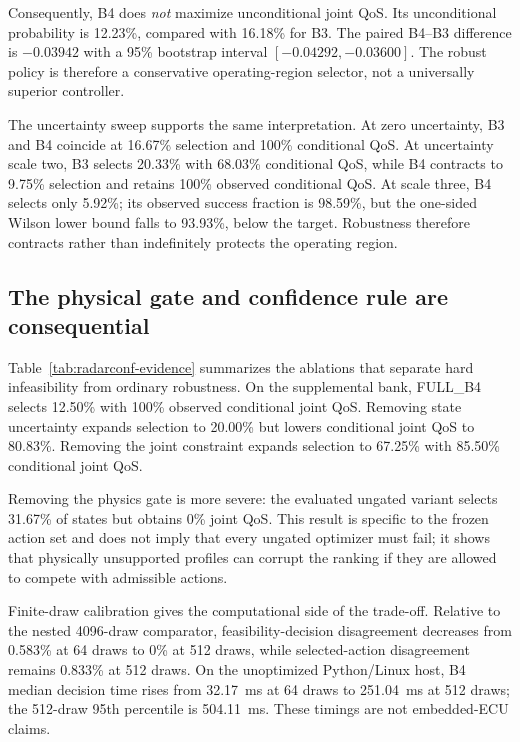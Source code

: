 \documentclass[conference,a4paper]{IEEEtran}
\begin{document}
Consequently, B4 does \emph{not} maximize unconditional joint QoS. Its unconditional probability is 12.23\%, compared with 16.18\% for B3. The paired B4--B3 difference is $-0.03942$ with a 95\% bootstrap interval $[-0.04292,-0.03600]$. The robust policy is therefore a conservative operating-region selector, not a universally superior controller.

The uncertainty sweep supports the same interpretation. At zero uncertainty, B3 and B4 coincide at 16.67\% selection and 100\% conditional QoS. At uncertainty scale two, B3 selects 20.33\% with 68.03\% conditional QoS, while B4 contracts to 9.75\% selection and retains 100\% observed conditional QoS. At scale three, B4 selects only 5.92\%; its observed success fraction is 98.59\%, but the one-sided Wilson lower bound falls to 93.93\%, below the target. Robustness therefore contracts rather than indefinitely protects the operating region.

\subsection{The physical gate and confidence rule are consequential}

Table~\ref{tab:radarconf-evidence} summarizes the ablations that separate hard infeasibility from ordinary robustness. On the supplemental bank, FULL\_B4 selects 12.50\% with 100\% observed conditional joint QoS. Removing state uncertainty expands selection to 20.00\% but lowers conditional joint QoS to 80.83\%. Removing the joint constraint expands selection to 67.25\% with 85.50\% conditional joint QoS.

Removing the physics gate is more severe: the evaluated ungated variant selects 31.67\% of states but obtains 0\% joint QoS. This result is specific to the frozen action set and does not imply that every ungated optimizer must fail; it shows that physically unsupported profiles can corrupt the ranking if they are allowed to compete with admissible actions.

Finite-draw calibration gives the computational side of the trade-off. Relative to the nested 4096-draw comparator, feasibility-decision disagreement decreases from 0.583\% at 64 draws to 0\% at 512 draws, while selected-action disagreement remains 0.833\% at 512 draws. On the unoptimized Python/Linux host, B4 median decision time rises from 32.17~ms at 64 draws to 251.04~ms at 512 draws; the 512-draw 95th percentile is 504.11~ms. These timings are not embedded-ECU claims.
\end{document}
